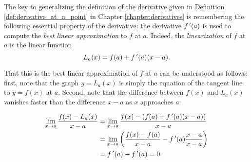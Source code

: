 The key to generalizing the definition of the derivative given in Definition \ref{def:derivative_at_a_point} in Chapter \ref{chapter:derivatives} is remembering the following essential property of the derivative: the derivative $f\,'(a)$ is used to compute the \emph{best linear approximation} to $f$ at $a$. Indeed, the \emph{linearization} of $f$ at $a$ is the linear function
\begin{equation}\label{eq_linearization}
L_a(x) = f(a) +f\,'(a)(x-a).
\end{equation}

That this is the best linear approximation of $f$ at $a$ can be understood as follows: first, note that the graph $y=L_a(x)$ is simply the equation of the tangent line to $y=f(x)$ at $a$. Second, note that the difference between $f(x)$ and $L_a(x)$ vanishes faster than the difference $x-a$ as $x$ approaches $a$:



\begin{align*}
\lim_{x\to a}\frac{f(x)-L_a(x)}{x-a} &= \lim_{x\to a}\frac{f(x)-(f(a)+f\,'(a)(x-a))}{x-a}\\
& = \lim_{x\to a}\left(\frac{f(x)-f(a)}{x-a}-f\,'(a)\frac{x-a}{x-a}\right)\\
& = f\,'(a)-f\,'(a)=0.
\end{align*}



